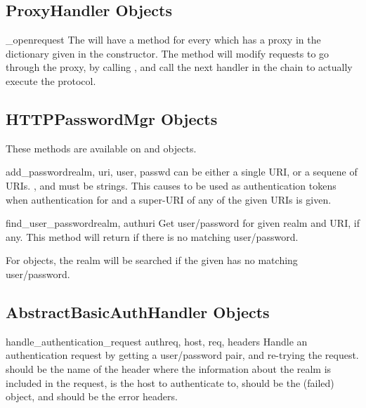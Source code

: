 \subsection{ProxyHandler Objects \label{proxy-handler}}

\begin{methoddescni}[ProxyHandler]{_open}{request}
The  will have a method
 for every  which has a
proxy in the  dictionary given in the constructor.  The
method will modify requests to go through the proxy, by calling
, and call the next handler in the chain to
actually execute the protocol.
\end{methoddescni}


\subsection{HTTPPasswordMgr Objects \label{http-password-mgr}}

These methods are available on  and
 objects.

\begin{methoddesc}[HTTPPasswordMgr]{add_password}{realm, uri, user, passwd}
 can be either a single URI, or a sequene of URIs. ,
 and  must be strings. This causes
 to be used as authentication tokens
when authentication for  and a super-URI of any of the
given URIs is given.
\end{methoddesc}  

\begin{methoddesc}[HTTPPasswordMgr]{find_user_password}{realm, authuri}
Get user/password for given realm and URI, if any.  This method will
return  if there is no matching user/password.

For  objects, the realm
 will be searched if the given  has no matching
user/password.
\end{methoddesc}


\subsection{AbstractBasicAuthHandler Objects
            \label{abstract-basic-auth-handler}}

\begin{methoddesc}[AbstractBasicAuthHandler]{handle_authentication_request}
                                            {authreq, host, req, headers}
Handle an authentication request by getting a user/password pair, and
re-trying the request.   should be the name of the header
where the information about the realm is included in the request,
 is the host to authenticate to,  should be the
(failed)  object, and  should be the error
headers.
\end{methoddesc}


